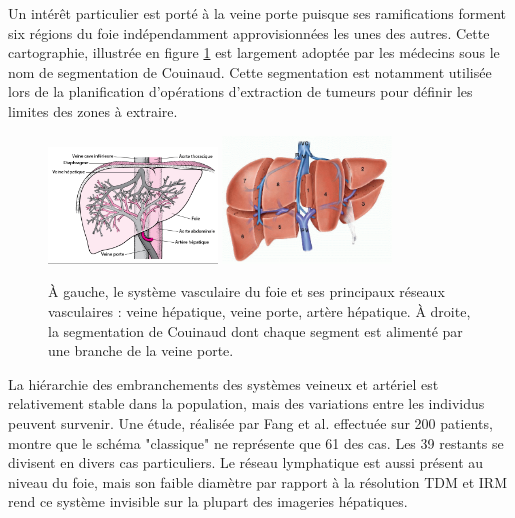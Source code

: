 Un intérêt particulier est porté à la veine porte puisque ses ramifications forment six régions du foie indépendamment approvisionnées les unes des autres. Cette cartographie, illustrée en figure \ref{fig:liver veins} est largement adoptée par les médecins sous le nom de segmentation de Couinaud. Cette segmentation est notamment utilisée lors de la planification d'opérations d'extraction de tumeurs pour définir les limites des zones à extraire. 
\begin{figure}[!ht]
    \centering
    \includegraphics[width=0.4\textwidth]{Images/Liver_vasculature.png}
    \includegraphics[width=0.4\textwidth]{Images/Couinaud.png}
    \caption{À gauche, le système vasculaire du foie et ses principaux réseaux vasculaires : veine hépatique, veine porte, artère hépatique. À droite, la segmentation de Couinaud dont chaque segment est alimenté par une branche de la veine porte.\protect \footnotemark} 
    \label{fig:liver veins}
  \end{figure}
La hiérarchie des embranchements des systèmes veineux et artériel est relativement stable dans la population, mais des variations entre les individus peuvent survenir. Une étude, réalisée par Fang et al. \cite{Fang2012_Liver_vein_variations} effectuée sur 200 patients, montre que le schéma "classique" ne représente que 61 \percent{}des cas. Les 39 \percent{}restants se divisent en divers cas particuliers. Le réseau lymphatique est aussi présent au niveau du foie, mais son faible diamètre par rapport à la résolution TDM et IRM rend ce système invisible sur la plupart des imageries hépatiques. 

